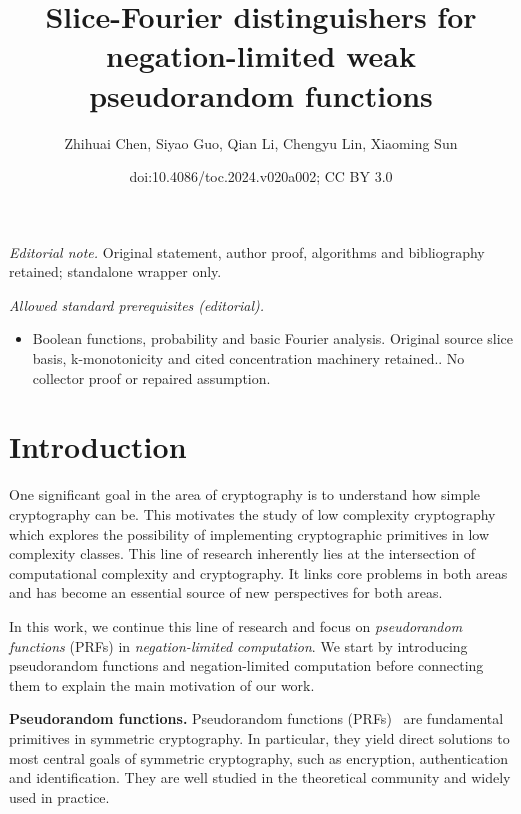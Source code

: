 \documentclass[11pt]{article}
\title{Slice-Fourier distinguishers for negation-limited weak pseudorandom functions}
\author{Zhihuai Chen, Siyao Guo, Qian Li, Chengyu Lin, Xiaoming Sun}
\date{doi:10.4086/toc.2024.v020a002; CC BY 3.0}
\numberwithin{equation}{section}
\theoremstyle{definition}
\theoremstyle{plain}
\begin{document}
\maketitle
\noindent\textit{Editorial note.} Original statement, author proof, algorithms and bibliography retained; standalone wrapper only.\par\medskip
\noindent\textit{Allowed standard prerequisites (editorial).}\begin{itemize}
\item Boolean functions, probability and basic Fourier analysis. Original source slice basis, k-monotonicity and cited concentration machinery retained.. No collector proof or repaired assumption.
\end{itemize}\medskip
\section{Introduction}

One significant goal in the area of cryptography is to understand how simple cryptography can be.  This motivates the study of low complexity cryptography which explores the possibility of implementing cryptographic primitives in low complexity classes. This line of research inherently lies at the intersection of computational complexity and cryptography. It links core problems in both areas and has become an essential source of new perspectives for both areas.

In this work, we continue this line of research and focus on \emph{pseudorandom functions} (PRFs) in \emph{negation-limited computation}. We start by introducing pseudorandom functions and negation-limited computation before connecting them to explain the main motivation of our work.

\vspace{2ex}
\noindent\textbf{Pseudorandom functions.} Pseudorandom functions (PRFs)~\cite{GGM} are fundamental primitives in symmetric cryptography. In particular, they yield direct solutions to most central goals of symmetric cryptography, such as encryption, authentication and identification. They are well studied in the theoretical community and widely used in practice.
\end{document}
